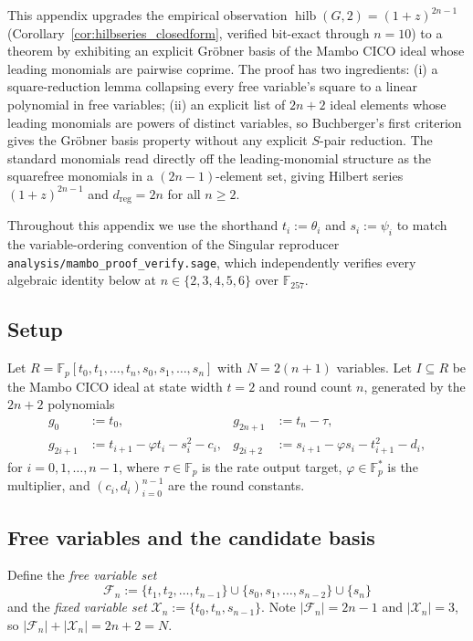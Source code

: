 \documentclass[11pt,a4paper]{article}
\theoremstyle{definition}
\newcommand{\F}{\mathbb{F}}
\begin{document}
This appendix upgrades the empirical observation $\operatorname{hilb}(G,2)
= (1+z)^{2n-1}$ (Corollary~\ref{cor:hilbseries_closedform}, verified
bit-exact through $n = 10$) to a theorem by exhibiting an explicit
Gr\"obner basis of the Mambo CICO ideal whose leading monomials are
pairwise coprime. The proof has two ingredients: (i) a
square-reduction lemma collapsing every free variable's square to a
linear polynomial in free variables; (ii) an explicit list of $2n+2$
ideal elements whose leading monomials are powers of distinct
variables, so Buchberger's first criterion gives the Gr\"obner basis
property without any explicit $S$-pair reduction. The standard
monomials read directly off the leading-monomial structure as the
squarefree monomials in a $(2n-1)$-element set, giving Hilbert series
$(1+z)^{2n-1}$ and $d_{\mathrm{reg}} = 2n$ for all $n \ge 2$.

Throughout this appendix we use the shorthand $t_i := \theta_i$ and
$s_i := \psi_i$ to match the variable-ordering convention of the
Singular reproducer
\texttt{analysis/mambo\_proof\_verify.sage}, which independently
verifies every algebraic identity below at $n \in \{2, 3, 4, 5, 6\}$
over $\F_{257}$.

\subsection{Setup}\label{app:dreg:setup}

Let $R = \F_p[t_0, t_1, \ldots, t_n, s_0, s_1, \ldots, s_n]$ with
$N = 2(n+1)$ variables. Let $I \subseteq R$ be the Mambo CICO ideal
at state width $t = 2$ and round count $n$, generated by the $2n+2$
polynomials
\begin{align*}
g_0  &:= t_0,
& g_{2n+1}  &:= t_n - \tau,\\
g_{2i+1} &:= t_{i+1} - \varphi t_i - s_i^2 - c_i,
& g_{2i+2} &:= s_{i+1} - \varphi s_i - t_{i+1}^2 - d_i,
\end{align*}
for $i = 0, 1, \ldots, n - 1$, where $\tau \in \F_p$ is the rate
output target, $\varphi \in \F_p^\ast$ is the multiplier, and
$(c_i, d_i)_{i = 0}^{n-1}$ are the round constants.

\subsection{Free variables and the candidate basis}\label{app:dreg:basis}

Define the \emph{free variable set}
\[
\mathcal{F}_n
:= \{ t_1, t_2, \ldots, t_{n-1} \}
\cup \{ s_0, s_1, \ldots, s_{n-2} \}
\cup \{ s_n \}
\]
and the \emph{fixed variable set}
$\mathcal{X}_n := \{ t_0, t_n, s_{n-1} \}$.
Note $|\mathcal{F}_n| = 2n - 1$ and $|\mathcal{X}_n| = 3$, so
$|\mathcal{F}_n| + |\mathcal{X}_n| = 2n + 2 = N$.
\end{document}
